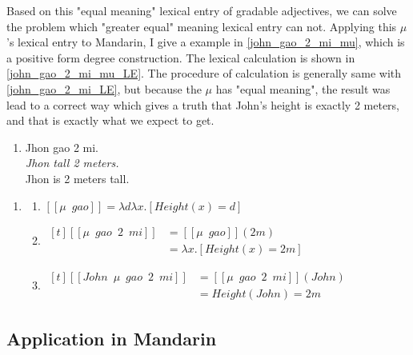\documentclass{ctexart}
\begin{document}
Based on this "equal meaning" lexical entry of gradable adjectives, we can solve the problem which "greater equal" meaning lexical entry can not. Applying this $\mu$'s lexical entry to Mandarin, I give a example in \ref{john_gao_2_mi_mu}, which is a positive form degree construction. The lexical calculation is shown in \ref{john_gao_2_mi_mu_LE}. The procedure of calculation is generally same with \ref{john_gao_2_mi_LE}, but because the $\mu$ has "equal meaning", the result was lead to a correct way which gives a truth that John's height is exactly 2 meters, and that is exactly what we expect to get.

\begin{enumerate}[resume]
    \item \label{john_gao_2_mi_mu} 
    Jhon gao 2 mi. \\
    \textit{Jhon tall 2 meters.} \\
    Jhon is 2 meters tall.
\end{enumerate}

\begin{enumerate}[resume]
    \item \label{john_gao_2_mi_mu_LE}
    
    \begin{enumerate}[ref=(\arabic{enumi}\alph*)]
    \item
    $[\![\mu \enspace gao]\!] = \lambda d \lambda x.[Height(x) = d]$
    
    \item
    $\begin{aligned}[t]
        [\![\mu \enspace gao \enspace 2 \enspace mi]\!] &= [\![\mu \enspace gao]\!](2m) \\
        &= \lambda x.[Height(x) = 2m]
    \end{aligned}$
    
    \item
    $\begin{aligned}[t]
        [\![John \enspace \mu \enspace gao \enspace 2 \enspace mi]\!] &= [\![\mu \enspace gao \enspace 2 \enspace mi]\!](John) \\
        &= Height(John) = 2m
    \end{aligned}$
    
    \end{enumerate}
\end{enumerate}


\subsection{Application in Mandarin}
\end{document}
